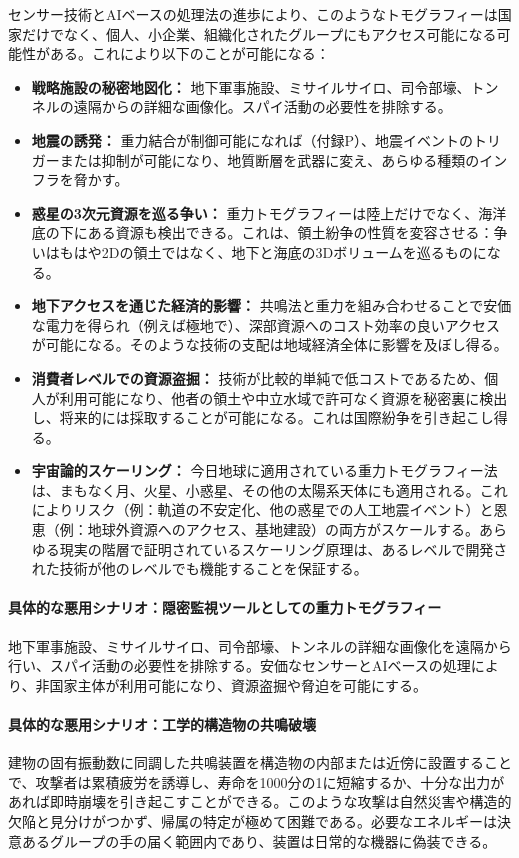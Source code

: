 \documentclass[12pt,a4paper]{article}
\theoremstyle{remark}
\begin{document}
	センサー技術とAIベースの処理法の進歩により、このようなトモグラフィーは国家だけでなく、個人、小企業、組織化されたグループにもアクセス可能になる可能性がある。これにより以下のことが可能になる：
	\begin{itemize}[leftmargin=*]
		\item \textbf{戦略施設の秘密地図化：} 地下軍事施設、ミサイルサイロ、司令部壕、トンネルの遠隔からの詳細な画像化。スパイ活動の必要性を排除する。
		\item \textbf{地震の誘発：} 重力結合が制御可能になれば（付録P）、地震イベントのトリガーまたは抑制が可能になり、地質断層を武器に変え、あらゆる種類のインフラを脅かす。
		\item \textbf{惑星の3次元資源を巡る争い：} 重力トモグラフィーは陸上だけでなく、海洋底の下にある資源も検出できる。これは、領土紛争の性質を変容させる：争いはもはや2Dの領土ではなく、地下と海底の3Dボリュームを巡るものになる。
		\item \textbf{地下アクセスを通じた経済的影響：} 共鳴法と重力を組み合わせることで安価な電力を得られ（例えば極地で）、深部資源へのコスト効率の良いアクセスが可能になる。そのような技術の支配は地域経済全体に影響を及ぼし得る。
		\item \textbf{消費者レベルでの資源盗掘：} 技術が比較的単純で低コストであるため、個人が利用可能になり、他者の領土や中立水域で許可なく資源を秘密裏に検出し、将来的には採取することが可能になる。これは国際紛争を引き起こし得る。
		\item \textbf{宇宙論的スケーリング：} 今日地球に適用されている重力トモグラフィー法は、まもなく月、火星、小惑星、その他の太陽系天体にも適用される。これによりリスク（例：軌道の不安定化、他の惑星での人工地震イベント）と恩恵（例：地球外資源へのアクセス、基地建設）の両方がスケールする。あらゆる現実の階層で証明されているスケーリング原理は、あるレベルで開発された技術が他のレベルでも機能することを保証する。
	\end{itemize}
	
	\paragraph{具体的な悪用シナリオ：隠密監視ツールとしての重力トモグラフィー}
	地下軍事施設、ミサイルサイロ、司令部壕、トンネルの詳細な画像化を遠隔から行い、スパイ活動の必要性を排除する。安価なセンサーとAIベースの処理により、非国家主体が利用可能になり、資源盗掘や脅迫を可能にする。
	
	\paragraph{具体的な悪用シナリオ：工学的構造物の共鳴破壊}
	建物の固有振動数に同調した共鳴装置を構造物の内部または近傍に設置することで、攻撃者は累積疲労を誘導し、寿命を1000分の1に短縮するか、十分な出力があれば即時崩壊を引き起こすことができる。このような攻撃は自然災害や構造的欠陥と見分けがつかず、帰属の特定が極めて困難である。必要なエネルギーは決意あるグループの手の届く範囲内であり、装置は日常的な機器に偽装できる。
	
\end{document}
